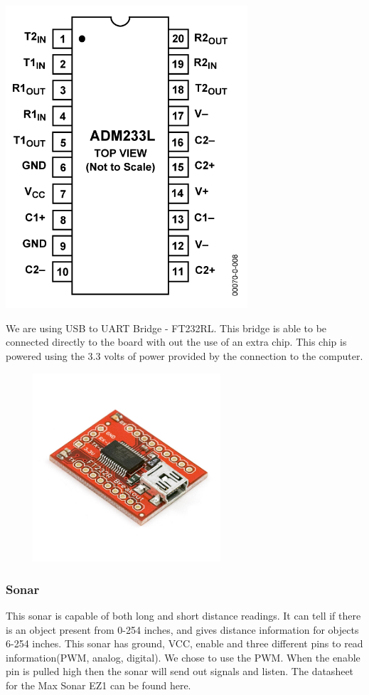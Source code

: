   \begin{center}
    \includegraphics[width=90mm]{imageSources/serialUART.png}
  \end{center}
  \label{serialUART}


We are using USB to UART Bridge - FT232RL. This bridge is able to be connected directly to the board with out the use of an extra chip. This chip is powered using the 3.3 volts of power provided by the connection to the computer. 


  \begin{center}
    \includegraphics[width=90mm, height= 70mm]{imageSources/usbUART.png}
  \end{center}
  \label{usbUART}


\subsubsection{Sonar}
This sonar is capable of both long and short distance readings. It can tell if there is an object present from 0-254 inches, and gives distance information for objects 6-254 inches. This sonar has ground, VCC, enable and three different pins to read information(PWM, analog, digital). We chose to use the PWM.  When the enable pin is pulled high then the sonar will send out signals and listen.  The datasheet for the Max Sonar EZ1 can be found here.


